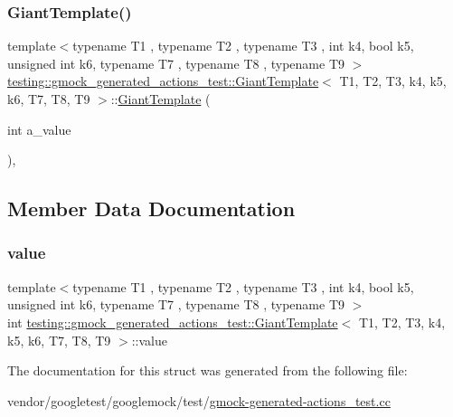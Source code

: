 \subsubsection{\texorpdfstring{Giant\+Template()}{GiantTemplate()}}
{\footnotesize\ttfamily template$<$typename T1 , typename T2 , typename T3 , int k4, bool k5, unsigned int k6, typename T7 , typename T8 , typename T9 $>$ \\
\hyperlink{structtesting_1_1gmock__generated__actions__test_1_1_giant_template}{testing\+::gmock\+\_\+generated\+\_\+actions\+\_\+test\+::\+Giant\+Template}$<$ T1, T2, T3, k4, k5, k6, T7, T8, T9 $>$\+::\hyperlink{structtesting_1_1gmock__generated__actions__test_1_1_giant_template}{Giant\+Template} (\begin{DoxyParamCaption}\item[{int}]{a\+\_\+value }\end{DoxyParamCaption})\hspace{0.3cm}{\ttfamily [inline]}, {\ttfamily [explicit]}}



\subsection{Member Data Documentation}
\mbox{\label{structtesting_1_1gmock__generated__actions__test_1_1_giant_template_afa0f7a8e5ac8c8b7c59d60ad66980856}} 
\subsubsection{\texorpdfstring{value}{value}}
{\footnotesize\ttfamily template$<$typename T1 , typename T2 , typename T3 , int k4, bool k5, unsigned int k6, typename T7 , typename T8 , typename T9 $>$ \\
int \hyperlink{structtesting_1_1gmock__generated__actions__test_1_1_giant_template}{testing\+::gmock\+\_\+generated\+\_\+actions\+\_\+test\+::\+Giant\+Template}$<$ T1, T2, T3, k4, k5, k6, T7, T8, T9 $>$\+::value}



The documentation for this struct was generated from the following file\+:\begin{DoxyCompactItemize}
\item 
vendor/googletest/googlemock/test/\hyperlink{gmock-generated-actions__test_8cc}{gmock-\/generated-\/actions\+\_\+test.\+cc}\end{DoxyCompactItemize}
